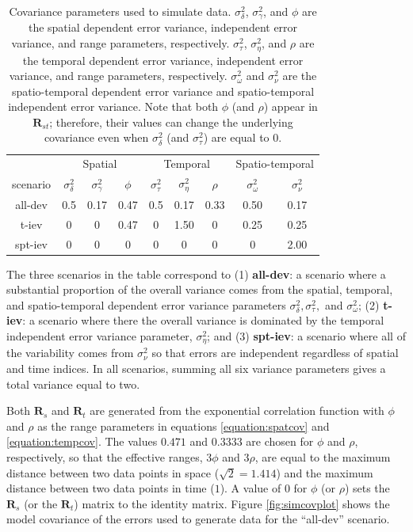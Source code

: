 \documentclass[smallextended]{svjour3}       %
\begin{document}
\begin{table}[H]

\caption{\label{tab:simparmtab}Covariance parameters used to simulate data. $\sigma^2_{\delta}$, $\sigma^2_{\gamma}$, and $\phi$ are the spatial dependent error variance, independent error variance, and range parameters, respectively. $\sigma^2_{\tau}$, $\sigma^2_{\eta}$, and $\rho$ are the temporal dependent error variance, independent error variance, and range parameters, respectively. $\sigma^2_{\omega}$ and $\sigma^2_{\nu}$ are the spatio-temporal dependent error variance and spatio-temporal independent error variance. Note that both $\phi$ (and $\rho$) appear in $\mathbf{R}_{st}$; therefore, their values can change the underlying covariance even when $\sigma^2_{\delta}$ (and $\sigma^2_{\tau}$) are equal to 0.}
\centering
\begin{tabular}[t]{ccccccccc}
\toprule
\multicolumn{1}{c}{ } & \multicolumn{3}{c}{Spatial} & \multicolumn{3}{c}{Temporal} & \multicolumn{2}{c}{Spatio-temporal} \\
\cmidrule(l{3pt}r{3pt}){2-4} \cmidrule(l{3pt}r{3pt}){5-7} \cmidrule(l{3pt}r{3pt}){8-9}
scenario & $\sigma^2_{\delta}$ & $\sigma^2_{\gamma}$ & $\phi$ & $\sigma^2_{\tau}$ & $\sigma^2_{\eta}$ & $\rho$ & $\sigma^2_{\omega}$ & $\sigma^2_{\nu}$\\
\midrule
all-dev & 0.5 & 0.17 & 0.47 & 0.5 & 0.17 & 0.33 & 0.50 & 0.17\\
t-iev & 0 & 0 & 0.47 & 0 & 1.50 & 0 & 0.25 & 0.25\\
spt-iev & 0 & 0 & 0 & 0 & 0 & 0 & 0 & 2.00\\
\bottomrule
\end{tabular}
\end{table}

The three scenarios in the table correspond to (1) \textbf{all-dev}: a
scenario where a substantial proportion of the overall variance comes
from the spatial, temporal, and spatio-temporal dependent error variance
parameters \(\sigma^2_{\delta}, \sigma^2_{\tau},\) and
\(\sigma^2_{\omega}\); (2) \textbf{t-iev}: a scenario where there the
overall variance is dominated by the temporal independent error variance
parameter, \(\sigma^2_{\eta}\); and (3) \textbf{spt-iev}: a scenario
where all of the variability comes from \(\sigma^2_{\nu}\) so that
errors are independent regardless of spatial and time indices. In all
scenarios, summing all six variance parameters gives a total variance
equal to two.

Both \(\mathbf{R}_{s}\) and \(\mathbf{R}_t\) are generated from the
exponential correlation function with \(\phi\) and \(\rho\) as the range
parameters in equations \ref{equation:spatcov} and
\ref{equation:tempcov}. The values \(0.471\) and \(0.3333\) are chosen
for \(\phi\) and \(\rho\), respectively, so that the effective ranges,
\(3 \phi\) and \(3 \rho\), are equal to the maximum distance between two
data points in space (\(\sqrt2 = 1.414\)) and the maximum distance
between two data points in time (\(1\)). A value of 0 for \(\phi\) (or
\(\rho\)) sets the \(\mathbf{R}_{s}\) (or the \(\mathbf{R}_t\)) matrix
to the identity matrix. Figure \ref{fig:simcovplot} shows the model
covariance of the errors used to generate data for the ``all-dev''
scenario.
\end{document}
